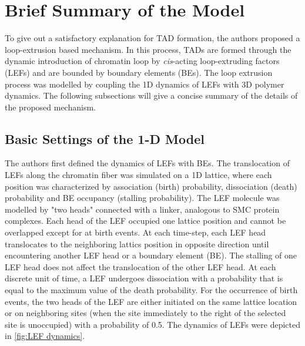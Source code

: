 \documentclass[11pt]{article}
\begin{document}
\section{Brief Summary of the Model}

To give out a satisfactory explanation for TAD formation, the authors proposed a loop-extrusion based mechanism. In this process, TADs are formed through the dynamic introduction of chromatin loop by \textit{cis}-acting loop-extruding factors (LEFs) and are bounded by boundary elements (BEs). The loop extrusion process was modelled by coupling the 1D dynamics of LEFs with 3D polymer dynamics. The following subsections will give a concise summary of the details of the proposed mechanism.

\subsection{Basic Settings of the 1-D Model}

The authors first defined the dynamics of LEFs with BEs. The translocation of LEFs along the chromatin fiber was simulated on a 1D lattice, where each position was characterized by association (birth) probability, dissociation (death) probability and BE occupancy (stalling probability). The LEF molecule was modelled by "two heads" connected with a linker, analogous to SMC protein complexes. Each head of the LEF occupied one lattice position and cannot be overlapped except for at birth events. At each time-step, each LEF head translocates to the neighboring lattics position in opposite direction until encountering another LEF head or a boundary element (BE). The stalling of one LEF head does not affect the translocation of the other LEF head.
At each discrete unit of time, a LEF undergoes dissociation with a probability that is equal to the maximum value of the death probability. For the occurrence of birth events, the two heads of the LEF are either initiated on the same lattice location or on neighboring sites (when the site immediately to the right of the selected site is unoccupied) with a probability of 0.5. The dynamics of LEFs were depicted in \cref{fig:LEF dynamics}.
\end{document}
